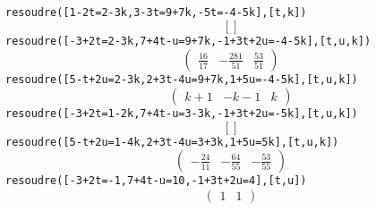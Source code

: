 \documentclass{cornouaille}
\begin{document}
\begin{TP}
\noindent {} {\tt resoudre([1-2t=2-3k,3-3t=9+7k,-5t=-4-5k],[t,k]) } \\
\begin{equation} \label{eq:0}
[]
\end{equation}
\noindent {} {\tt resoudre([-3+2t=2-3k,7+4t-u=9+7k,-1+3t+2u=-4-5k],[t,u,k]) } \\
\begin{equation} \label{eq:1}
\left(\begin{array}{ccc}
\frac{16}{17} & -\frac{281}{51} & \frac{53}{51}
\end{array}\right) 
\end{equation}
\noindent {} {\tt resoudre([5-t+2u=2-3k,2+3t-4u=9+7k,1+5u=-4-5k],[t,u,k]) } \\
\begin{equation} \label{eq:2}
\left(\begin{array}{ccc}
k+1 & -k-1 & k
\end{array}\right) 
\end{equation}
\noindent {} {\tt resoudre([-3+2t=1-2k,7+4t-u=3-3k,-1+3t+2u=-5k],[t,u,k]) } \\
\begin{equation} \label{eq:3}
[]
\end{equation}
\noindent {} {\tt resoudre([5-t+2u=1-4k,2+3t-4u=3+3k,1+5u=5k],[t,u,k]) } \\
\begin{equation} \label{eq:4}
\left(\begin{array}{ccc}
-\frac{24}{11} & -\frac{64}{55} & -\frac{53}{55}
\end{array}\right) 
\end{equation}
\noindent {} {\tt resoudre([-3+2t=-1,7+4t-u=10,-1+3t+2u=4],[t,u]) } \\
\begin{equation} \label{eq:5}
\left(\begin{array}{cc}
1 & 1
\end{array}\right) 
\end{equation}


\end{TP}
\end{document}

